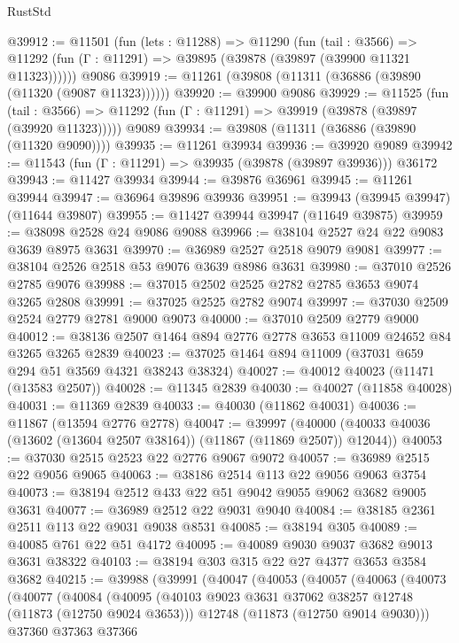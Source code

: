 \begin{lexlean}{RustStd}
\begin{coremodule}
@39912 := @11501
    (fun (lets : @11288) =>
    @11290
      (fun (tail : @3566) =>
      @11292 (fun (Γ : @11291) => @39895 (@39878 (@39897 (@39900 @11321 @11323))))))
    @9086
@39919 := @11261 (@39808 (@11311 (@36886 (@39890 (@11320 (@9087 @11323))))))
@39920 := @39900 @9086
@39929 := @11525
    (fun (tail : @3566) => @11292 (fun (Γ : @11291) => @39919 (@39878 (@39897 (@39920 @11323)))))
    @9089
@39934 := @39808 (@11311 (@36886 (@39890 (@11320 @9090))))
@39935 := @11261 @39934
@39936 := @39920 @9089
@39942 := @11543 (fun (Γ : @11291) => @39935 (@39878 (@39897 @39936))) @36172
@39943 := @11427 @39934
@39944 := @39876 @36961
@39945 := @11261 @39944
@39947 := @36964 @39896 @39936
@39951 := @39943 (@39945 @39947) (@11644 @39807)
@39955 := @11427 @39944 @39947 (@11649 @39875)
@39959 := @38098 @2528 @24 @9086 @9088
@39966 := @38104 @2527 @24 @22 @9083 @3639 @8975 @3631
@39970 := @36989 @2527 @2518 @9079 @9081
@39977 := @38104 @2526 @2518 @53 @9076 @3639 @8986 @3631
@39980 := @37010 @2526 @2785 @9076
@39988 := @37015 @2502 @2525 @2782 @2785 @3653 @9074 @3265 @2808
@39991 := @37025 @2525 @2782 @9074
@39997 := @37030 @2509 @2524 @2779 @2781 @9000 @9073
@40000 := @37010 @2509 @2779 @9000
@40012 := @38136 @2507 @1464 @894 @2776 @2778 @3653 @11009 @24652 @84 @3265 @3265 @2839
@40023 := @37025 @1464 @894 @11009 (@37031 @659 @294 @51 @3569 @4321 @38243 @38324)
@40027 := @40012 @40023 (@11471 (@13583 @2507))
@40028 := @11345 @2839
@40030 := @40027 (@11858 @40028)
@40031 := @11369 @2839
@40033 := @40030 (@11862 @40031)
@40036 := @11867 (@13594 @2776 @2778)
@40047 := @39997
    (@40000 (@40033 @40036 (@13602 (@13604 @2507 @38164)) (@11867 (@11869 @2507)) @12044))
@40053 := @37030 @2515 @2523 @22 @2776 @9067 @9072
@40057 := @36989 @2515 @22 @9056 @9065
@40063 := @38186 @2514 @113 @22 @9056 @9063 @3754
@40073 := @38194 @2512 @433 @22 @51 @9042 @9055 @9062 @3682 @9005 @3631
@40077 := @36989 @2512 @22 @9031 @9040
@40084 := @38185 @2361 @2511 @113 @22 @9031 @9038 @8531
@40085 := @38194 @305
@40089 := @40085 @761 @22 @51 @4172
@40095 := @40089 @9030 @9037 @3682 @9013 @3631 @38322
@40103 := @38194 @303 @315 @22 @27 @4377 @3653 @3584 @3682
@40215 := @39988
    (@39991
      (@40047
        (@40053
          (@40057
            (@40063
              (@40073
                (@40077
                  (@40084
                    (@40095
                      (@40103 @9023 @3631 @37062 @38257 @12748 (@11873 (@12750 @9024 @3653)))
                      @12748
                      (@11873 (@12750 @9014 @9030)))
                    @37360
                    @37363
                    @37366

\end{coremodule}
\end{lexlean}
